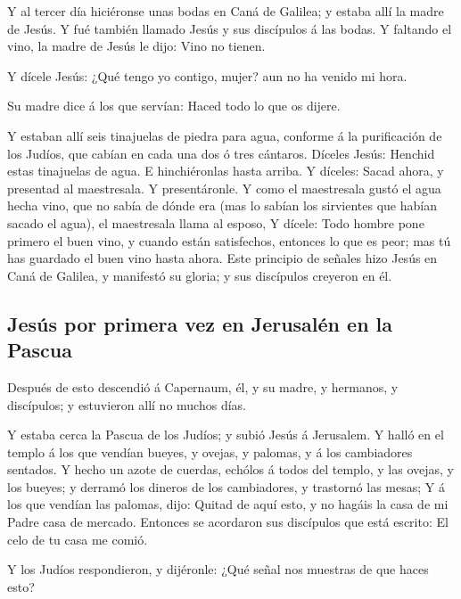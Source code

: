  Y al tercer día hiciéronse unas bodas en Caná de Galilea;
y estaba allí la madre de Jesús.  Y fué también llamado
Jesús y sus discípulos á las bodas.  Y faltando el vino,
la madre de Jesús le dijo: Vino no tienen.

 Y dícele Jesús: ¿Qué tengo yo contigo, mujer? aun no ha
venido mi hora.

 Su madre dice á los que servían: Haced todo lo que os
dijere.

 Y estaban allí seis tinajuelas de piedra para agua,
conforme á la purificación de los Judíos, que cabían en cada una dos ó
tres cántaros.  Díceles Jesús: Henchid estas tinajuelas de
agua. E hinchiéronlas hasta arriba.  Y díceles: Sacad
ahora, y presentad al maestresala. Y presentáronle.  Y
como el maestresala gustó el agua hecha vino, que no sabía de dónde era
(mas lo sabían los sirvientes que habían sacado el agua), el maestresala
llama al esposo,  Y dícele: Todo hombre pone primero el
buen vino, y cuando están satisfechos, entonces lo que es peor; mas tú
has guardado el buen vino hasta ahora.  Este principio de
señales hizo Jesús en Caná de Galilea, y manifestó su gloria; y sus
discípulos creyeron en él.

\hypertarget{jesuxfas-por-primera-vez-en-jerusaluxe9n-en-la-pascua}{%
\subsection{Jesús por primera vez en Jerusalén en la
Pascua}\label{jesuxfas-por-primera-vez-en-jerusaluxe9n-en-la-pascua}}

 Después de esto descendió á Capernaum, él, y su madre, y
hermanos, y discípulos; y estuvieron allí no muchos días.

 Y estaba cerca la Pascua de los Judíos; y subió Jesús á
Jerusalem.  Y halló en el templo á los que vendían
bueyes, y ovejas, y palomas, y á los cambiadores sentados.
 Y hecho un azote de cuerdas, echólos á todos del templo,
y las ovejas, y los bueyes; y derramó los dineros de los cambiadores, y
trastornó las mesas;  Y á los que vendían las palomas,
dijo: Quitad de aquí esto, y no hagáis la casa de mi Padre casa de
mercado.  Entonces se acordaron sus discípulos que está
escrito: El celo de tu casa me comió.

 Y los Judíos respondieron, y dijéronle: ¿Qué señal nos
muestras de que haces esto?

